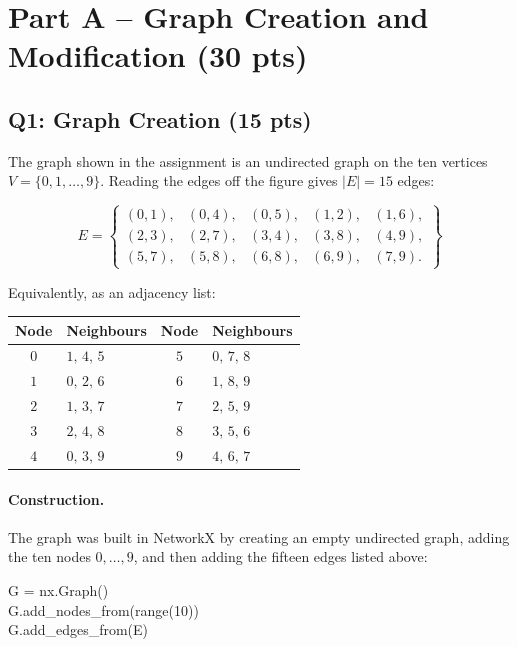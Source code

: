 \section*{Part A -- Graph Creation and Modification (30 pts)}

\subsection*{Q1: Graph Creation (15 pts)}

The graph shown in the assignment is an undirected graph on the ten vertices
$V=\{0,1,\dots,9\}$. Reading the edges off the figure gives $|E|=15$ edges:

\[
E=\left\{
\begin{array}{lllll}
(0,1), & (0,4), & (0,5), & (1,2), & (1,6),\\
(2,3), & (2,7), & (3,4), & (3,8), & (4,9),\\
(5,7), & (5,8), & (6,8), & (6,9), & (7,9).
\end{array}
\right\}
\]

Equivalently, as an adjacency list:

\begin{center}
\begin{tabular}{cl@{\qquad}cl}
\toprule
Node & Neighbours & Node & Neighbours \\
\midrule
$0$ & $1,\,4,\,5$ & $5$ & $0,\,7,\,8$ \\
$1$ & $0,\,2,\,6$ & $6$ & $1,\,8,\,9$ \\
$2$ & $1,\,3,\,7$ & $7$ & $2,\,5,\,9$ \\
$3$ & $2,\,4,\,8$ & $8$ & $3,\,5,\,6$ \\
$4$ & $0,\,3,\,9$ & $9$ & $4,\,6,\,7$ \\
\bottomrule
\end{tabular}
\end{center}

\paragraph{Construction.} The graph was built in NetworkX by creating an empty
undirected graph, adding the ten nodes $0,\dots,9$, and then adding the fifteen
edges listed above:

\begin{center}
\ttfamily
G = nx.Graph()\\
G.add\_nodes\_from(range(10))\\
G.add\_edges\_from(E)
\end{center}

